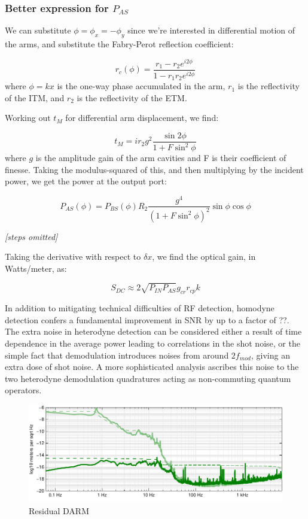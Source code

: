 \subsubsection{Better expression for $P_{AS}$}

We can substitute $\phi=\phi_{x}=-\phi_{y}$ since we're interested
in differential motion of the arms, and substitute the Fabry-Perot
reflection coefficient:

\begin{equation}
r_{c}(\phi)=\frac{r_{1}-r_{2}e^{i2\phi}}{1-r_{1}r_{2}e^{i2\phi}}\end{equation}
where $\phi=kx$ is the one-way phase accumulated in the arm, $r_{1}$
is the reflectivity of the ITM, and $r_{2}$ is the reflectivity of
the ETM.

Working out $t_{M}$ for differential arm displacement, we find:

\begin{equation}
t_{M}=ir_{2}g^{2}\frac{\sin2\phi}{1+F\sin^{2}\phi}\end{equation}
where $g$ is the amplitude gain of the arm cavities and F is their
coefficient of finesse. Taking the modulus-squared of this, and then
multiplying by the incident power, we get the power at the output
port:

\begin{equation}
P_{AS}(\phi)=P_{BS}(\phi)R_{2}\frac{g^{4}}{\left(1+F\sin^{2}\phi\right)^{2}}\sin\phi\cos\phi\end{equation}


\emph{{[}steps omitted{]}}

Taking the derivative with respect to $\delta x$, we find the optical
gain, in Watts/meter, as:

\begin{equation}
S_{DC}\approx2\sqrt{P_{IN}P_{AS}}g_{cr}r_{cp}k\label{eq:dc-readout-optical-gain}\end{equation}




In addition to mitigating technical difficulties of RF detection,
homodyne detection confers a fundamental improvement in SNR by up to a
factor of ??. The extra noise in heterodyne detection can be
considered either a result of time dependence in the average power
leading to correlations in the shot
noise\cite{Niebauer1991Nonstationary}, or the simple fact that
demodulation introduces noises from around $2f_{mod}$, giving
an extra dose of shot noise.  A more sophisticated analysis ascribes
this noise to the two heterodyne demodulation quadratures acting as
non-commuting quantum operators\cite{Buonanno2003Quantum}.

\begin{figure}[t]
\centerline{\includegraphics[width=\columnwidth]{figures/residualDARM.pdf}}
\caption{\label{fig:residual-DARM}Residual DARM}
\end{figure}
